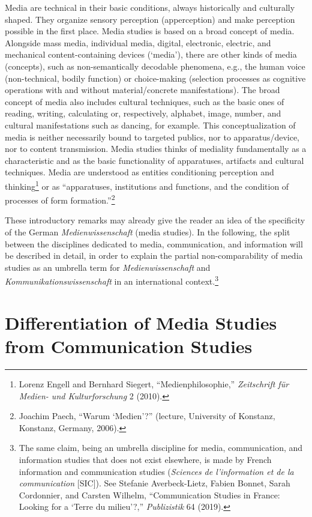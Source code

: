 \documentclass{tufte-handout}
\begin{document}
Media are technical in their basic conditions, always historically and
culturally shaped. They organize sensory perception (apperception) and
make perception possible in the first place. Media studies is based on a
broad concept of media. Alongside mass media, individual media, digital,
electronic, electric, and mechanical content-containing devices
(`media'), there are other kinds of media (concepts), such as
non-semantically decodable phenomena, e.g., the human voice
(non-technical, bodily function) or choice-making (selection processes
as cognitive operations with and without material/concrete
manifestations). The broad concept of media also includes cultural
techniques, such as the basic ones of reading, writing, calculating or,
respectively, alphabet, image, number, and cultural manifestations such
as dancing, for example. This conceptualization of media is neither
necessarily bound to targeted publics, nor to apparatus/device, nor to
content transmission. Media studies thinks of mediality fundamentally as
a characteristic and as the basic functionality of apparatuses,
artifacts and cultural techniques. Media are understood as entities
conditioning perception and thinking\footnote{Lorenz Engell and Bernhard
  Siegert, ``Medienphilosophie,'' \emph{Zeitschrift für Medien- und
  Kulturforschung} 2 (2010).} or as ``apparatuses, institutions and
functions, and the condition of processes of form
formation.''\footnote{Joachim Paech, ``Warum `Medien'?'' (lecture,
  University of Konstanz, Konstanz, Germany, 2006).}

These introductory remarks may already give the reader an idea of the
specificity of the German \emph{Medienwissenschaft} (media studies). In
the following, the split between the disciplines dedicated to media,
communication, and information will be described in detail, in order to
explain the partial non-comparability of media studies as an umbrella
term for \emph{Medienwissenschaft} and \emph{Kommunikationswissenschaft}
in an international context.\footnote{The same claim, being an umbrella
  discipline for media, communication, and information studies that does
  not exist elsewhere, is made by French information and communication
  studies (\emph{Sciences de l'information et de la communication}
  {[}SIC{]}). See Stefanie Averbeck-Lietz, Fabien Bonnet, Sarah
  Cordonnier, and Carsten Wilhelm, ``Communication Studies in France:
  Looking for a `Terre du milieu'?,'' \emph{Publizistik} 64 (2019).}

\hypertarget{differentiation-of-media-studies-from-communication-studies}{%
\section{\texorpdfstring{Differentiation of Media Studies from
Communication Studies
}{Differentiation of Media Studies from Communication Studies }}\label{differentiation-of-media-studies-from-communication-studies}}
\end{document}
